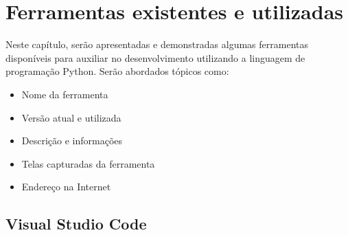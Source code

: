 

\chapter{Ferramentas existentes e utilizadas}
Neste capítulo, serão apresentadas e demonstradas algumas ferramentas disponíveis para auxiliar no desenvolvimento utilizando a linguagem de programação Python. Serão abordados tópicos como: 
 \begin{itemize}
	\item Nome da ferramenta
	\item Versão atual e utilizada
	\item Descrição e informações
	\item Telas capturadas da ferramenta
	\item Endereço na Internet
\end{itemize}

    \section{Visual Studio Code}

